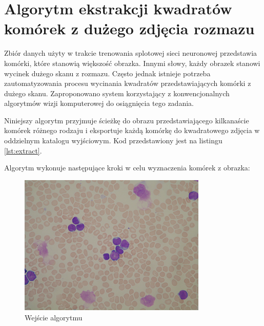 \section{Algorytm ekstrakcji kwadratów komórek z dużego zdjęcia rozmazu}\label{sec:kwadraty}

Zbiór danych użyty w trakcie trenowania splotowej sieci neuronowej przedstawia komórki, które stanowią większość obrazka.
Innymi słowy, każdy obrazek stanowi wycinek dużego skanu z rozmazu.
Często jednak istnieje potrzeba zautomatyzowania procesu wycinania kwadratów przedstawiających komórki z dużego skanu.
Zaproponowano system korzystający z konwencjonalnych algorytmów wizji komputerowej do osiągnięcia tego zadania.

Niniejszy algorytm przyjmuje ścieżkę do obrazu przedstawiającego kilkanaście komórek różnego rodzaju i eksportuje
każdą komórkę do kwadratowego zdjęcia w oddzielnym katalogu wyjściowym.
Kod przedstawiony jest na listingu \ref{lst:extract}.



Algorytm wykonuje następujące kroki w celu wyznaczenia komórek z obrazka:

\begin{figure}
    \centering
    \includegraphics[width=0.8\textwidth]{Im060_1}
    \caption{Wejście algorytmu}
    \label{fig:extract_input}
\end{figure}

